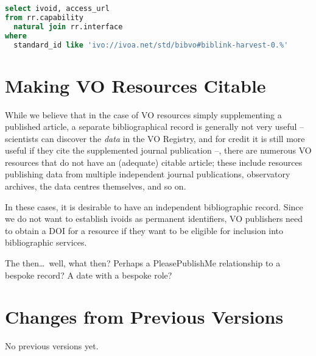 \documentclass[11pt,a4paper]{ivoa}
\begin{document}
\begin{lstlisting}[language=SQL]
select ivoid, access_url
from rr.capability
  natural join rr.interface
where
  standard_id like 'ivo://ivoa.net/std/bibvo#biblink-harvest-0.%'
\end{lstlisting}

\section{Making VO Resources Citable}

While we believe that in the case of VO resources simply supplementing a
published article, a separate bibliographical record is generally not
very useful -- scientists can discover the \emph{data} in the VO
Registry, and for credit it is still more useful if they cite the
supplemented journal publication --, there are numerous VO resources
that do not have an (adequate) citable article; these include resources
publishing data from multiple independent journal publications,
observatory archives, the data centres themselves, and so on.

In these cases, it is desirable to have an independent bibliographic
record.  Since we do not want to establish ivoids as permanent
identifiers, VO publishers need to obtain a DOI for a resource if they
want to be eligible for inclusion into bibliographic services.

The then\dots~well, what then?  Perhaps a PleasePublishMe relationship
to a bespoke record?  A date with a bespoke role?

\appendix
\section{Changes from Previous Versions}

No previous versions yet.



\end{document}
